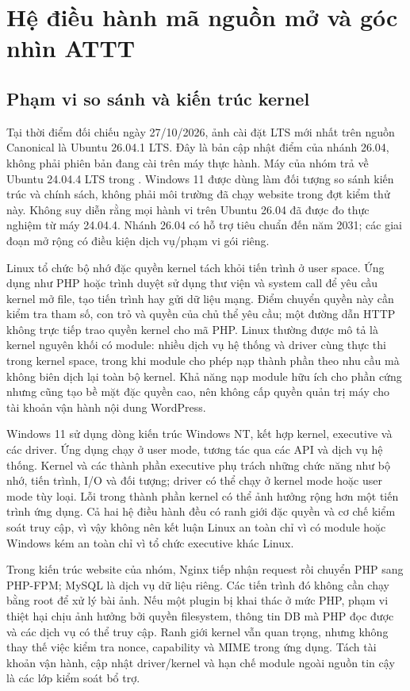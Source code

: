 \chapter{Hệ điều hành mã nguồn mở và góc nhìn ATTT}
\label{ch:os}
\section{Phạm vi so sánh và kiến trúc kernel}
Tại thời điểm đối chiếu ngày 27/10/2026, ảnh cài đặt LTS mới nhất trên nguồn Canonical là Ubuntu 26.04.1 LTS. Đây là bản cập nhật điểm của nhánh 26.04, không phải phiên bản đang cài trên máy thực hành. Máy của nhóm trả về Ubuntu 24.04.4 LTS trong . Windows 11 được dùng làm đối tượng so sánh kiến trúc và chính sách, không phải môi trường đã chạy website trong đợt kiểm thử này. Không suy diễn rằng mọi hành vi trên Ubuntu 26.04 đã được đo thực nghiệm từ máy 24.04.4. Nhánh 26.04 có hỗ trợ tiêu chuẩn đến năm 2031; các giai đoạn mở rộng có điều kiện dịch vụ/phạm vi gói riêng.\cite{ubuntuRelease,ubuntuCycle}

Linux tổ chức bộ nhớ đặc quyền kernel tách khỏi tiến trình ở user space. Ứng dụng như PHP hoặc trình duyệt sử dụng thư viện và system call để yêu cầu kernel mở file, tạo tiến trình hay gửi dữ liệu mạng. Điểm chuyển quyền này cần kiểm tra tham số, con trỏ và quyền của chủ thể yêu cầu; một đường dẫn HTTP không trực tiếp trao quyền kernel cho mã PHP. Linux thường được mô tả là kernel nguyên khối có module: nhiều dịch vụ hệ thống và driver cùng thực thi trong kernel space, trong khi module cho phép nạp thành phần theo nhu cầu mà không biên dịch lại toàn bộ kernel. Khả năng nạp module hữu ích cho phần cứng nhưng cũng tạo bề mặt đặc quyền cao, nên không cấp quyền quản trị máy cho tài khoản vận hành nội dung WordPress.\cite{linuxSyscall,linuxModules}

Windows 11 sử dụng dòng kiến trúc Windows NT, kết hợp kernel, executive và các driver. Ứng dụng chạy ở user mode, tương tác qua các API và dịch vụ hệ thống. Kernel và các thành phần executive phụ trách những chức năng như bộ nhớ, tiến trình, I/O và đối tượng; driver có thể chạy ở kernel mode hoặc user mode tùy loại. Lỗi trong thành phần kernel có thể ảnh hưởng rộng hơn một tiến trình ứng dụng. Cả hai hệ điều hành đều có ranh giới đặc quyền và cơ chế kiểm soát truy cập, vì vậy không nên kết luận Linux an toàn chỉ vì có module hoặc Windows kém an toàn chỉ vì tổ chức executive khác Linux.\cite{windowsModes,windowsExecutive}

Trong kiến trúc website của nhóm, Nginx tiếp nhận request rồi chuyển PHP sang PHP-FPM; MySQL là dịch vụ dữ liệu riêng. Các tiến trình đó không cần chạy bằng root để xử lý bài ảnh. Nếu một plugin bị khai thác ở mức PHP, phạm vi thiệt hại chịu ảnh hưởng bởi quyền filesystem, thông tin DB mà PHP đọc được và các dịch vụ có thể truy cập. Ranh giới kernel vẫn quan trọng, nhưng không thay thế việc kiểm tra nonce, capability và MIME trong ứng dụng. Tách tài khoản vận hành, cập nhật driver/kernel và hạn chế module ngoài nguồn tin cậy là các lớp kiểm soát bổ trợ.

